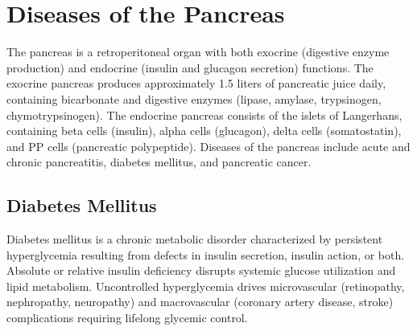 \chapter{Diseases of the Pancreas}
\label{ch:pancreas}
The pancreas is a retroperitoneal organ with both exocrine (digestive enzyme production) and endocrine (insulin and glucagon secretion) functions. The exocrine pancreas produces approximately 1.5 liters of pancreatic juice daily, containing bicarbonate and digestive enzymes (lipase, amylase, trypsinogen, chymotrypsinogen). The endocrine pancreas consists of the islets of Langerhans, containing beta cells (insulin), alpha cells (glucagon), delta cells (somatostatin), and PP cells (pancreatic polypeptide). Diseases of the pancreas include acute and chronic pancreatitis, diabetes mellitus, and pancreatic cancer.

\section{Diabetes Mellitus}




Diabetes mellitus is a chronic metabolic disorder characterized by persistent hyperglycemia resulting from defects in insulin secretion, insulin action, or both. Absolute or relative insulin deficiency disrupts systemic glucose utilization and lipid metabolism. Uncontrolled hyperglycemia drives microvascular (retinopathy, nephropathy, neuropathy) and macrovascular (coronary artery disease, stroke) complications requiring lifelong glycemic control.





\label{sec:Diabetes Mellitus}

